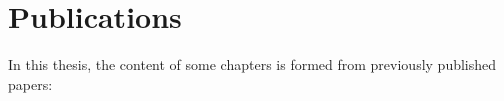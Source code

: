\chapter*{Publications}

In this thesis, the content of some chapters is formed from
previously published papers:
\begin{refsection}[ownpubs]
    \small
    \nocite{*} %
    \printbibliography[heading=none]
\end{refsection}

